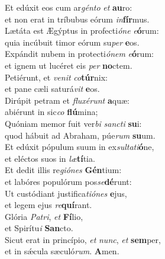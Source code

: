\evenverse Et edúxit eos cum ar\textit{gén}\textit{to} \textit{et} \textbf{au}ro:~\*\\
\evenverse et non erat in tríbubus eórum \textit{in}\textbf{fír}mus.\\
\oddverse Lætáta est Ægýptus in profecti\textit{ó}\textit{ne} \textit{e}\textbf{ó}rum:~\*\\
\oddverse quia incúbuit timor eórum su\textit{per} \textbf{e}os.\\
\evenverse Expándit nubem in protecti\textit{ó}\textit{nem} \textit{e}\textbf{ó}rum:~\*\\
\evenverse et ignem ut lucéret eis \textit{per} \textbf{no}ctem.\\
\oddverse Petiérunt, et \textit{ve}\textit{nit} \textit{co}\textbf{túr}nix:~\*\\
\oddverse et pane cæli saturá\textit{vit} \textbf{e}os.\\
\evenverse Dirúpit petram et \textit{flu}\textit{xé}\textit{runt} \textbf{a}quæ:~\*\\
\evenverse abiérunt in sic\textit{co} \textbf{flú}mina;\\
\oddverse Quóniam memor fuit ver\textit{bi} \textit{san}\textit{cti} \textbf{su}i:~\*\\
\oddverse quod hábuit ad Abraham, púe\textit{rum} \textbf{su}um.\\
\evenverse Et edúxit pópulum suum in ex\textit{sul}\textit{ta}\textit{ti}\textbf{ó}ne,~\*\\
\evenverse et eléctos suos in \textit{læ}\textbf{tí}tia.\\
\oddverse Et dedit illis re\textit{gi}\textit{ó}\textit{nes} \textbf{Gén}tium:~\*\\
\oddverse et labóres populórum pos\textit{se}\textbf{dé}runt:\\
\evenverse Ut custódiant justifica\textit{ti}\textit{ó}\textit{nes} \textbf{e}jus,~\*\\
\evenverse et legem ejus \textit{re}\textbf{quí}rant.\\
\oddverse Glória \textit{Pa}\textit{tri}, \textit{et} \textbf{Fí}lio,~\*\\
\oddverse et Spirítu\textit{i} \textbf{San}cto.\\
\evenverse Sicut erat in princípio, \textit{et} \textit{nunc}, \textit{et} \textbf{sem}per,~\*\\
\evenverse et in sǽcula sæculó\textit{rum}. \textbf{A}men.\\
